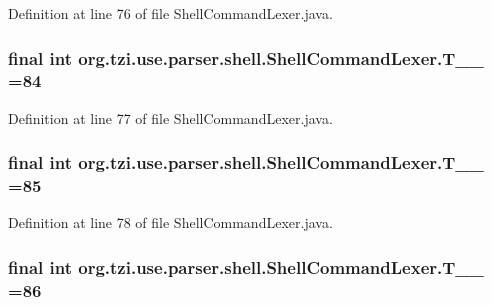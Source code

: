 Definition at line 76 of file Shell\-Command\-Lexer.\-java.

\hypertarget{classorg_1_1tzi_1_1use_1_1parser_1_1shell_1_1_shell_command_lexer_ab965d5ebdedf5051f640066ae0204b3b}{
\subsubsection[{T\-\_\-\-\_\-84}]{\setlength{\rightskip}{0pt plus 5cm}final int org.\-tzi.\-use.\-parser.\-shell.\-Shell\-Command\-Lexer.\-T\-\_\-\-\_ =84\hspace{0.3cm}{\ttfamily [static]}}}\label{classorg_1_1tzi_1_1use_1_1parser_1_1shell_1_1_shell_command_lexer_ab965d5ebdedf5051f640066ae0204b3b}


Definition at line 77 of file Shell\-Command\-Lexer.\-java.

\hypertarget{classorg_1_1tzi_1_1use_1_1parser_1_1shell_1_1_shell_command_lexer_a9373d62359d4f6a60b84347b3ef908fc}{
\subsubsection[{T\-\_\-\-\_\-85}]{\setlength{\rightskip}{0pt plus 5cm}final int org.\-tzi.\-use.\-parser.\-shell.\-Shell\-Command\-Lexer.\-T\-\_\-\-\_ =85\hspace{0.3cm}{\ttfamily [static]}}}\label{classorg_1_1tzi_1_1use_1_1parser_1_1shell_1_1_shell_command_lexer_a9373d62359d4f6a60b84347b3ef908fc}


Definition at line 78 of file Shell\-Command\-Lexer.\-java.

\hypertarget{classorg_1_1tzi_1_1use_1_1parser_1_1shell_1_1_shell_command_lexer_a4aa82228e4bc7758e0ef2a23f8671135}{
\subsubsection[{T\-\_\-\-\_\-86}]{\setlength{\rightskip}{0pt plus 5cm}final int org.\-tzi.\-use.\-parser.\-shell.\-Shell\-Command\-Lexer.\-T\-\_\-\-\_ =86\hspace{0.3cm}{\ttfamily [static]}}}\label{classorg_1_1tzi_1_1use_1_1parser_1_1shell_1_1_shell_command_lexer_a4aa82228e4bc7758e0ef2a23f8671135}


